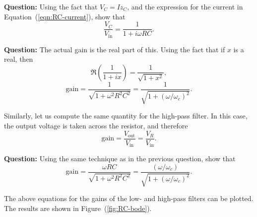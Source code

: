 \begin{question}
    \textbf{Question:} Using the fact that $V_C = I z_C$, and the expression for the current in Equation~(\ref{eqn:RC-current}), show that 
    \begin{equation}
        \frac{V_C}{V_\text{in}} = \frac{1}{1 + i \omega R C}.
    \end{equation}

    \textbf{Question:} The actual gain is the real part of this. Using the fact that if $x$ is a real, then
    \begin{equation}
        \Re \left( \frac{1}{1 + i x }\right) = \frac{1}{\sqrt{1 + x^2}},
    \end{equation}
    \begin{equation}
        \text{gain} = \dfrac{1}{\sqrt{1 + \omega^2 R^2 C^2}} = \frac{1}{\sqrt{1 + \left(\omega/\omega_c\right)^2}}.
    \end{equation}
    
\end{question}


Similarly, let us compute the same quantity for the high-pass filter. In this case, the output voltage is taken across the resistor, and therefore
\begin{equation}
    \text{gain} = \frac{V_\text{out}}{V_\text{in}} = \frac{V_R}{V_\text{in}}.
\end{equation}

\begin{question}
    \textbf{Question:} Using the same technique as in the previous question, show that 
    \begin{equation}
        \text{gain} = \dfrac{\omega R C}{\sqrt{1 + \omega^2 R^2 C^2}} = \frac{\left(\omega/\omega_c\right)}{\sqrt{1 + \left(\omega/\omega_c\right)^2}}.
    \end{equation}
\end{question}

The above equations for the gains of the low- and high-pass filters can be plotted. The results are shown in Figure~(\ref{fig:RC-bode}).

